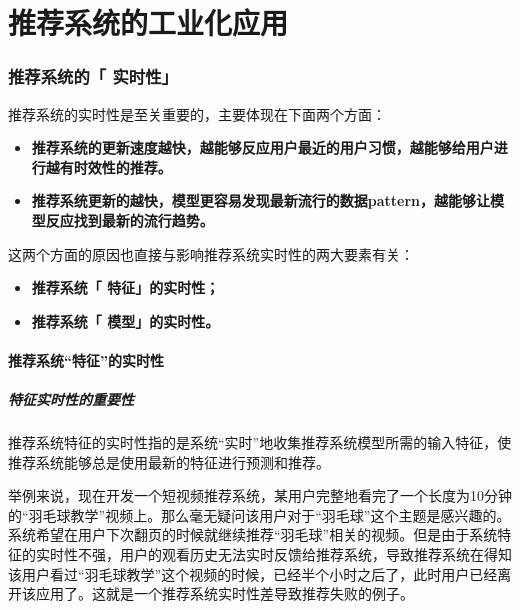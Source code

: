 \documentclass[12pt]{article}
\begin{document}
\part{推荐系统的工业化应用}
\section{推荐系统的「 实时性」\cite{Real_Time_Requirement_Of_Recommender_System}\cite{Real_Time_Requirement_Of_Model_Update}}
推荐系统的实时性是至关重要的，主要体现在下面两个方面：
\begin{itemize}
\setlength{\itemsep}{0pt}
\setlength{\parsep}{0pt}
\setlength{\parskip}{0pt}
    \item \textbf{推荐系统的更新速度越快，越能够反应用户最近的用户习惯，越能够给用户进行越有时效性的推荐。}
    \item \textbf{推荐系统更新的越快，模型更容易发现最新流行的数据pattern，越能够让模型反应找到最新的流行趋势。}
\end{itemize}

这两个方面的原因也直接与影响推荐系统实时性的两大要素有关：
\begin{itemize}
\setlength{\itemsep}{0pt}
\setlength{\parsep}{0pt}
\setlength{\parskip}{0pt}
    \item \textbf{推荐系统「 特征」的实时性；}
    \item \textbf{推荐系统「 模型」的实时性。}
\end{itemize}

\subsection{推荐系统“特征”的实时性}
\subsubsection{特征实时性的重要性}
推荐系统特征的实时性指的是系统“实时”地收集推荐系统模型所需的输入特征，使推荐系统能够总是使用最新的特征进行预测和推荐。

\begin{framed}
举例来说，现在开发一个短视频推荐系统，某用户完整地看完了一个长度为10分钟的“羽毛球教学”视频上。那么毫无疑问该用户对于“羽毛球”这个主题是感兴趣的。系统希望在用户下次翻页的时候就继续推荐“羽毛球”相关的视频。但是由于系统特征的实时性不强，用户的观看历史无法实时反馈给推荐系统，导致推荐系统在得知该用户看过“羽毛球教学”这个视频的时候，已经半个小时之后了，此时用户已经离开该应用了。这就是一个推荐系统实时性差导致推荐失败的例子。
\end{framed}
\end{document}
